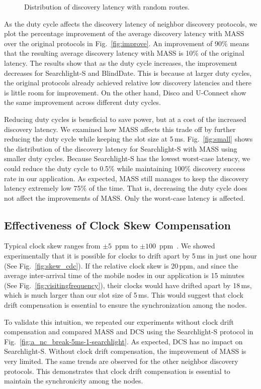 \documentclass[twoside,twocolumn]{article}
\begin{document}
\begin{figure}[t]
   \caption{Distribution of discovery latency with random routes.} 
   \label{fig:a_c_random-5ms-1}
   \endminipage\hfill
\end{figure}


As the duty cycle affects the discovery latency of neighbor discovery
protocols, we plot the percentage improvement of the average discovery
latency with MASS over the original protocols in
Fig.~\ref{fig:improve}. An improvement of 90\% means that the
resulting average discovery latency with MASS is 10\% of the original
latency. The results show that as the duty cycle increases, the
improvement decreases for Searchlight-S and BlindDate.  This is
because at larger duty cycles, the original protocols already achieved
relative low discovery latencies and there is little room for
improvement. On the other hand, Disco and U-Connect show the same
improvement across different duty cycles.

Reducing duty cycles is beneficial to save power, but at a cost of the
increased discovery latency.  We examined how MASS affects this trade
off by further reducing the duty cycle while keeping the slot size at
5\,ms. Fig.~\ref{fig:small} shows the distribution of the discovery
latency for Searchlight-S with MASS using smaller duty cycles. Because
Searchlight-S has the lowest worst-case latency, we could reduce the
duty cycle to 0.5\% while maintaining 100\% discovery success rate in
our application. As expected, MASS still manages to keep the discovery
latency extremely low 75\% of the time. That is, decreasing the duty
cycle does not affect the improvements of MASS.  Only the worst-case
latency is affected.

\subsection{Effectiveness of Clock Skew Compensation}

Typical clock skew ranges from $\pm5$~ppm to
$\pm100$~ppm~\citep{zhong2011demand}.  We showed experimentally that it
is possible for clocks to drift apart by 5\,ms in just one hour (See
Fig.~\ref{fig:skew_cdc}). If the relative clock skew is 20\,ppm, and
since the average inter-arrival time of the mobile nodes in our
application is 15 minutes (See Fig.~\ref{fig:visitingfrequency}),
their clocks would have drifted apart by 18\,ms, which is much larger
than our slot size of 5\,ms. This would suggest that clock drift
compensation is essential to ensure the synchronization among the
nodes.

To validate this intuition, we repeated our experiments without clock
drift compensation and compared MASS and DCS using the Searchlight-S
protocol in Fig.~\ref{fig:a_nc_break-5ms-1-searchlight}.  As
expected, DCS has no impact on Searchlight-S. Without clock drift
compensation, the improvement of MASS is very limited. The same trends
are observed for the other neighbor discovery protocols.  This
demonstrates that clock drift compensation is essential to maintain
the synchronicity among the nodes.
\end{document}
